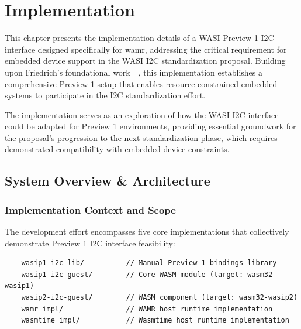 \chapter{Implementation}
\label{chap:implementation}

This chapter presents the implementation details of a WASI Preview 1 I2C interface designed specifically for \acrshort{wamr}, addressing the critical requirement for embedded device support in the WASI I2C standardization proposal. Building upon Friedrich's foundational work~\cite{friedrich_paper}~\cite{friedrich_impl}, this implementation establishes a comprehensive Preview 1 setup that enables resource-constrained embedded systems to participate in the I2C standardization effort.

The implementation serves as an exploration of how the WASI I2C interface could be adapted for Preview 1 environments, providing essential groundwork for the proposal's progression to the next standardization phase, which requires demonstrated compatibility with embedded device constraints.

\section{System Overview \& Architecture}
\label{sec:system-overview}

\subsection{Implementation Context and Scope}

The development effort encompasses five core implementations that collectively demonstrate Preview 1 I2C interface feasibility:

\begin{verbatim}
    wasip1-i2c-lib/          // Manual Preview 1 bindings library
    wasip1-i2c-guest/        // Core WASM module (target: wasm32-wasip1)
    wasip2-i2c-guest/        // WASM component (target: wasm32-wasip2)
    wamr_impl/               // WAMR host runtime implementation
    wasmtime_impl/           // Wasmtime host runtime implementation
\end{verbatim}

